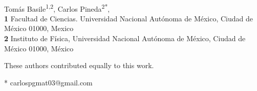 \documentclass[10pt,letterpaper]{article} %
\begin{document}
\vspace*{0.2in}

\begin{flushleft}
{\Large
\textbf{} %
}
\newline
\\
Tomás Basile\textsuperscript{1,2\Yinyang},
Carlos Pineda\textsuperscript{2*\Yinyang},
\\
\bigskip
\textbf{1} Facultad de Ciencias. Universidad Nacional Autónoma de México, Ciudad de México 01000, Mexico
\\
\textbf{2} Instituto de Física, Universidad Nacional Autónoma de México, Ciudad de México 01000, México
\\
\bigskip

% 
%
\Yinyang These authors contributed equally to this work.





* carlospgmat03@gmail.com

\end{flushleft}
\end{document}
